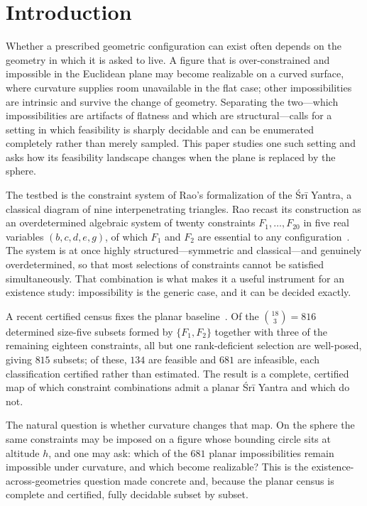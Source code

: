 \documentclass[11pt]{article}
\begin{document}
\section{Introduction}
\label{sec:intro}

Whether a prescribed geometric configuration can exist often depends on the
geometry in which it is asked to live. A figure that is over-constrained and
impossible in the Euclidean plane may become realizable on a curved surface,
where curvature supplies room unavailable in the flat case; other impossibilities are intrinsic and survive the change of geometry. Separating the two---which impossibilities are artifacts of flatness and which are structural---calls for a setting in which feasibility is sharply decidable and can be enumerated completely rather than merely sampled. This paper studies one such setting and asks how its feasibility landscape changes when the plane is replaced by the sphere.

The testbed is the constraint system of Rao's formalization of the Śrī Yantra, a classical diagram of nine interpenetrating triangles. Rao recast its construction as an overdetermined algebraic system of twenty constraints
$F_1,\dots,F_{20}$ in five real variables $(b,c,d,e,g)$, of which $F_1$ and $F_2$ are essential to any configuration~\cite{rao}. The system is at once highly structured---symmetric and classical---and genuinely overdetermined, so that most selections of constraints cannot be satisfied simultaneously. That combination is what makes it a useful instrument for an existence study: impossibility is the generic case, and it can be decided exactly.

A recent certified census fixes the planar baseline~\cite{plane-census}. Of the $\binom{18}{3}=816$ determined size-five subsets formed by $\{F_1,F_2\}$ together with three of the remaining eighteen constraints, all but one rank-deficient selection are well-posed, giving $815$ subsets; of these, $134$ are feasible and $681$ are infeasible, each classification certified rather than estimated. The result is a complete, certified map of which constraint combinations admit a planar Śrī Yantra and which do not.

The natural question is whether curvature changes that map. On the sphere the
same constraints may be imposed on a figure whose bounding circle sits at
altitude $h$, and one may ask: which of the $681$ planar impossibilities remain impossible under curvature, and which become realizable? This is the
existence-across-geometries question made concrete and, because the planar census is complete and certified, fully decidable subset by subset.
\end{document}
